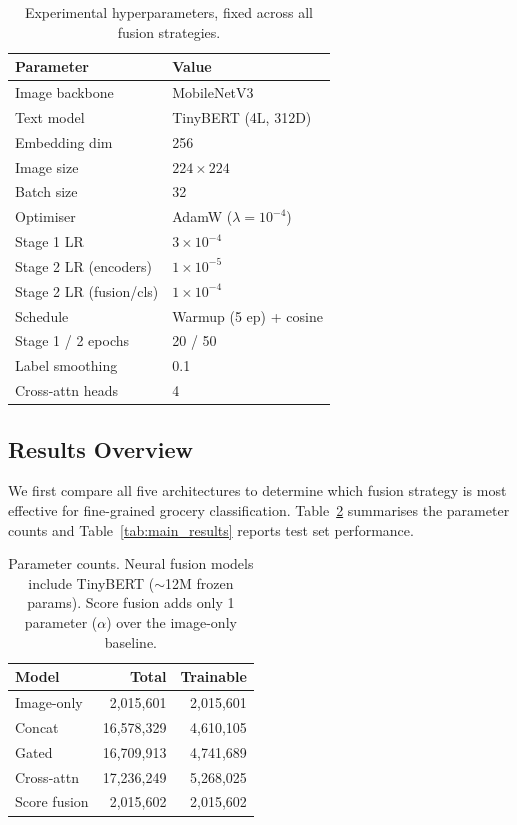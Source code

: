 \documentclass{article}
\begin{document}
\begin{table}[t]
\centering
\caption{Experimental hyperparameters, fixed across all fusion strategies.}
\label{tab:hyperparams}
\small
\begin{tabular}{@{}ll@{}}
\toprule
\textbf{Parameter} & \textbf{Value} \\
\midrule
Image backbone & MobileNetV3 \\
Text model & TinyBERT (4L, 312D) \\
Embedding dim & 256 \\
Image size & $224 \times 224$ \\
Batch size & 32 \\
Optimiser & AdamW ($\lambda = 10^{-4}$) \\
Stage 1 LR & $3 \times 10^{-4}$ \\
Stage 2 LR (encoders) & $1 \times 10^{-5}$ \\
Stage 2 LR (fusion/cls) & $1 \times 10^{-4}$ \\
Schedule & Warmup (5 ep) + cosine \\
Stage 1 / 2 epochs & 20 / 50 \\
Label smoothing & 0.1 \\
Cross-attn heads & 4 \\
\bottomrule
\end{tabular}
\end{table}

\subsection{Results Overview}

We first compare all five architectures to determine which fusion strategy is most effective for fine-grained grocery classification. Table~\ref{tab:params} summarises the parameter counts and Table~\ref{tab:main_results} reports test set performance.

\begin{table}[t]
\centering
\caption{Parameter counts. Neural fusion models include TinyBERT (${\sim}$12M frozen params). Score fusion adds only 1 parameter ($\alpha$) over the image-only baseline.}
\label{tab:params}
\small
\begin{tabular}{@{}lrr@{}}
\toprule
\textbf{Model} & \textbf{Total} & \textbf{Trainable} \\
\midrule
Image-only      & 2,015,601  & 2,015,601 \\
Concat          & 16,578,329 & 4,610,105 \\
Gated           & 16,709,913 & 4,741,689 \\
Cross-attn      & 17,236,249 & 5,268,025 \\
Score fusion    & 2,015,602  & 2,015,602 \\
\bottomrule
\end{tabular}
\end{table}
\end{document}
